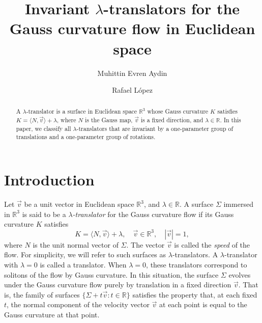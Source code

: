 \documentclass[12pt]{amsart}
\def\r{\mathbb R}
\theoremstyle{definition}
\begin{document}
\title{ Invariant $\lambda$-translators for the Gauss curvature flow in Euclidean space}
\author{Muhittin Evren Aydin}
\address{Department of Mathematics, Faculty of Science, Firat University. 23200 Elazig, Turkey.}
\address{ Departamento de Geometr\'{\i}a y Topolog\'{\i}a\\  Universidad de Granada. 18071 Granada, Spain}
\author{Rafael L\'opez}
\begin{abstract}
A $\lambda$-translator is a surface in Euclidean space $\r^3$ whose Gauss curvature $K$ satisfies   $K=\langle N, \vec{v} \rangle +\lambda$, where   $N$ is the Gauss map, $\vec{v}$ is a fixed direction, and $\lambda \in \r$. In this paper, we classify all $\lambda$-translators that are invariant by a one-parameter group of translations and a one-parameter group of rotations. 
 \end{abstract}

\maketitle


\section{Introduction}

Let $\vec{v}$ be a unit vector in Euclidean space $\r^3$, and $\lambda\in\r$. A surface $\Sigma$ immersed in $\r^3$ is said to be a {\it $\lambda$-translator} for the Gauss curvature flow if its Gauss curvature $K$ satisfies 
\begin{equation}\label{eq1}
K=\langle N, \vec{v} \rangle +\lambda, \quad \vec{v} \in \r^3, \quad |\vec{v}|=1, 
\end{equation}
where   $N$ is the unit normal vector of $\Sigma$. The vector $\vec{v}$ is called the  {\it speed} of the flow.  For simplicity, we will refer to such surfaces as $\lambda$-translators. A  $\lambda$-translator with $\lambda =0$ is  called a translator. 
 When $\lambda=0$, these translators   correspond to solitons of the flow by Gauss curvature. In this situation, the surface $\Sigma$ evolves under the Gauss curvature flow purely by translation in a fixed direction $\vec{v}$. That is, the family of surfaces $\{\Sigma+t\vec{v}:t\in \r \}$ satisfies the property that, at each fixed $t$, the normal component of the velocity vector $\vec{v}$ at each point is equal to the Gauss curvature at that point.  
\end{document}

